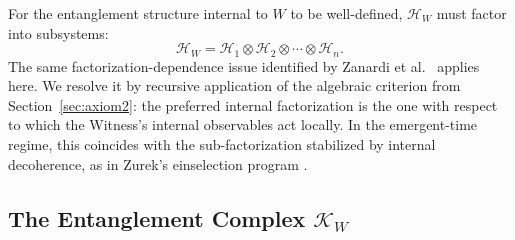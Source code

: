 \documentclass[11pt, a4paper]{article}
\begin{document}
For the entanglement structure internal to $W$ to be well-defined, $\mathcal{H}_W$ must factor into subsystems:
\begin{equation}
\mathcal{H}_W = \mathcal{H}_1 \otimes \mathcal{H}_2 \otimes \cdots \otimes \mathcal{H}_n.
\label{eq:internal}
\end{equation}
The same factorization-dependence issue identified by Zanardi et al.\ \cite{Zanardi2004} applies here. We resolve it by recursive application of the algebraic criterion from Section~\ref{sec:axiom2}: the preferred internal factorization is the one with respect to which the Witness's internal observables act locally. In the emergent-time regime, this coincides with the sub-factorization stabilized by internal decoherence, as in Zurek's einselection program \cite{Zurek2009}.

\subsection{The Entanglement Complex $\mathcal{K}_W$}
\label{sec:complex}
\end{document}

